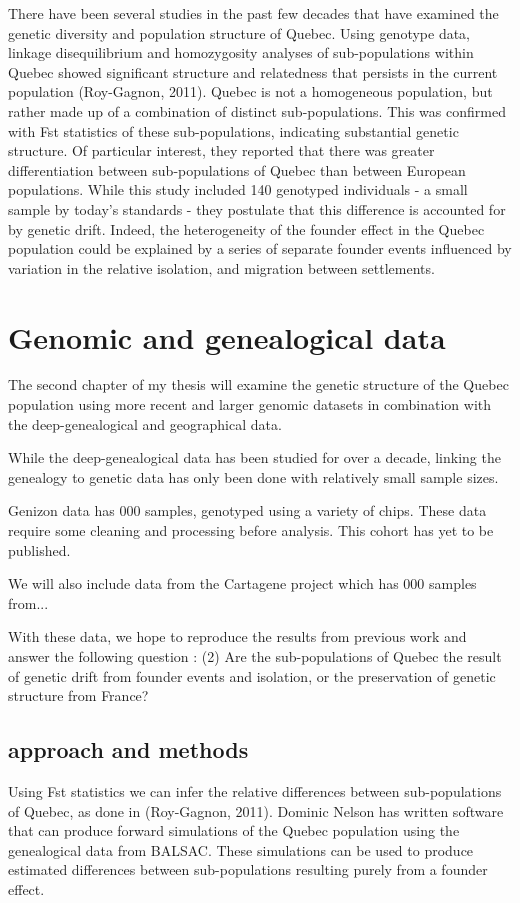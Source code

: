 \documentclass[
11pt, %
oneside, %
english, %
doublespacing, %
headsepline, %
]{MastersDoctoralThesis} %
\begin{document}
There have been several studies in the past few decades that have examined the genetic diversity and population structure of Quebec.
Using genotype data, linkage disequilibrium and homozygosity analyses of sub-populations within Quebec showed significant structure and relatedness that persists in the current population (Roy-Gagnon, 2011).
Quebec is not a homogeneous population, but rather made up of a combination of distinct sub-populations.
This was confirmed with Fst statistics of these sub-populations, indicating substantial genetic structure.
Of particular interest, they reported that there was greater differentiation between sub-populations of Quebec than between European populations.
While this study included 140 genotyped individuals - a small sample by today's standards - they postulate that this difference is accounted for by genetic drift.
Indeed, the heterogeneity of the founder effect in the Quebec population could be explained by a series of separate founder events influenced by variation in the relative isolation, and migration between settlements.

\section{Genomic and genealogical data}

The second chapter of my thesis will examine the genetic structure of the Quebec population using more recent and larger genomic datasets in combination with the deep-genealogical and geographical data.

While the deep-genealogical data has been studied for over a decade, linking the genealogy to genetic data has only been done with relatively small sample sizes. 

Genizon data has 000 samples, genotyped using a variety of chips. These data require some cleaning and processing before analysis. This cohort has yet to be published. 

We will also include data from the Cartagene project which has 000 samples from...

With these data, we hope to reproduce the results from previous work and answer the following question :
(2) Are the sub-populations of Quebec the result of genetic drift from founder events and isolation, or the preservation of genetic structure from France?

\subsection{approach and methods}
Using Fst statistics we can infer the relative differences between sub-populations of Quebec, as done in (Roy-Gagnon, 2011).
Dominic Nelson has written software that can produce forward simulations of the Quebec population using the genealogical data from BALSAC.
These simulations can be used to produce estimated differences between sub-populations resulting purely from a founder effect.
\end{document}
